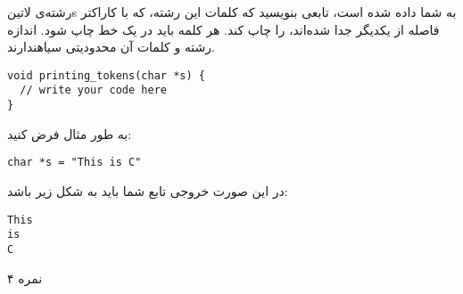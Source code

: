 \documentclass[../main.tex]{subfiles}
\begin{document}

رشته‌ی ‌لاتین{s} به شما داده شده است، تابعی بنویسید که کلمات این رشته، که با کاراکتر فاصله از یکدیگر جدا شده‌اند، را چاپ کند.
هر کلمه باید در یک خط چاپ شود.
اندازه رشته و کلمات آن محدودیتی ‌سیاه{ندارند}.

\begin{latin}
\begin{verbatim}
void printing_tokens(char *s) {
  // write your code here
}
\end{verbatim}
\end{latin}

به طور مثال فرض کنید:

\begin{latin}
\begin{verbatim}
char *s = "This is C"
\end{verbatim}
\end{latin}

در این صورت خروجی تابع شما باید به شکل زیر باشد:

\begin{latin}
\begin{verbatim}
This
is
C
\end{verbatim}
\end{latin}


۴ نمره
\end{document}
